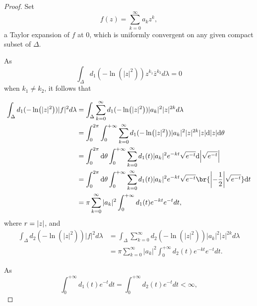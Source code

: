 \begin{proof}
  Set
$$f(z)=\sum_{k=0}^{\infty}a_{k}z^{k},$$
a Taylor expansion of $f$ at $0$,
which is uniformly convergent on any given compact subset of
$\Delta$.

As
$$\int_{\Delta}d_{1}(-\ln(|z|^{2}))z^{k_{1}}\bar{z}^{k_{2}}d\lambda=0$$
when $k_{1}\neq k_{2}$, it follows that

\begin{equation}
  \label{equ:polar.0919.1.a}
  \begin{split}
    \int_{\Delta}d_{1}(-\ln(|z|^{2}))|f|^{2}d\lambda
    &=\int_{\Delta}\sum_{k=0}^{\infty}d_{1}(-\ln(|z|^{2}))|a_{k}|^{2}|z|^{2k}d\lambda
    \\
    &=\int_{0}^{2\pi}\int_{0}^{+\infty}\sum_{k=0}^{\infty}d_{1}(-\ln(|z|^{2}))|a_{k}|^{2}|z|^{2k} \abs{z}\dd \abs{z} \dd \theta\\
    &=\int_{0}^{2\pi}\dd \theta\int_{0}^{+\infty}\sum_{k=0}^{\infty}d_{1}(t)|a_{k}|^{2}e^{-kt}\sqrt{e^{-t}}\dd \abs{\sqrt{e^{-t}}}\\ 
    &=\int_{0}^{2\pi}\dd \theta\int_{0}^{+\infty}\sum_{k=0}^{\infty}d_{1}(t)|a_{k}|^{2}e^{-kt}\sqrt{e^{-t}} \br{\abs{-\frac 12}\sqrt{e^{-t}}}\dd t\\ 
    &=\pi\sum_{k=0}^{\infty}|a_{k}|^{2}\int_{0}^{+\infty}d_{1}(t)e^{-kt}e^{-t}dt,
  \end{split}
\end{equation}
where $r=\abs{z}$,
and
\begin{equation}
\label{equ:polar.0919.2.a}
\begin{split}
\int_{\Delta}d_{2}(-\ln(|z|^{2}))|f|^{2}d\lambda
&=\int_{\Delta}\sum_{k=0}^{\infty}d_{2}(-\ln(|z|^{2}))|a_{k}|^{2}|z|^{2k}d\lambda
\\&=\pi\sum_{k=0}^{\infty}|a_{k}|^{2}\int_{0}^{+\infty}d_{2}(t)e^{-kt}e^{-t}dt.
\end{split}
\end{equation}

As
$$\int_{0}^{+\infty}d_{1}(t)e^{-t}dt=\int_{0}^{+\infty}d_{2}(t)e^{-t}dt<\infty,$$


\end{proof}
